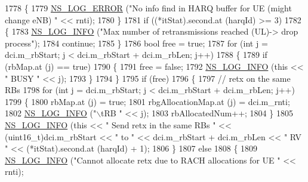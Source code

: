 \begin{DoxyCode}
1778                 \{
1779                   \hyperlink{group__logging_ga0261a8db1d4ac5f79417d117634fd455}{NS\_LOG\_ERROR} (\textcolor{stringliteral}{"No info find in HARQ buffer for UE (might change eNB) "} << 
      rnti);
1780                 \}
1781               \textcolor{keywordflow}{if} ((*itStat).second.at (harqId) >= 3)
1782                 \{
1783                   \hyperlink{group__logging_gafbd73ee2cf9f26b319f49086d8e860fb}{NS\_LOG\_INFO} (\textcolor{stringliteral}{"Max number of retransmissions reached (UL)-> drop process"});
1784                   \textcolor{keywordflow}{continue};
1785                 \}
1786               \textcolor{keywordtype}{bool} free = \textcolor{keyword}{true};
1787               \textcolor{keywordflow}{for} (\textcolor{keywordtype}{int} j = dci.m\_rbStart; j < dci.m\_rbStart + dci.m\_rbLen; j++)
1788                 \{
1789                   \textcolor{keywordflow}{if} (rbMap.at (j) == \textcolor{keyword}{true})
1790                     \{
1791                       free = \textcolor{keyword}{false};
1792                       \hyperlink{group__logging_gafbd73ee2cf9f26b319f49086d8e860fb}{NS\_LOG\_INFO} (\textcolor{keyword}{this} << \textcolor{stringliteral}{" BUSY "} << j);
1793                     \}
1794                 \}
1795               \textcolor{keywordflow}{if} (free)
1796                 \{
1797                   \textcolor{comment}{// retx on the same RBs}
1798                   \textcolor{keywordflow}{for} (\textcolor{keywordtype}{int} j = dci.m\_rbStart; j < dci.m\_rbStart + dci.m\_rbLen; j++)
1799                     \{
1800                       rbMap.at (j) = \textcolor{keyword}{true};
1801                       rbgAllocationMap.at (j) = dci.m\_rnti;
1802                       \hyperlink{group__logging_gafbd73ee2cf9f26b319f49086d8e860fb}{NS\_LOG\_INFO} (\textcolor{stringliteral}{"\(\backslash\)tRB "} << j);
1803                       rbAllocatedNum++;
1804                     \}
1805                   \hyperlink{group__logging_gafbd73ee2cf9f26b319f49086d8e860fb}{NS\_LOG\_INFO} (\textcolor{keyword}{this} << \textcolor{stringliteral}{" Send retx in the same RBs "} << (uint16\_t)dci.m\_rbStart 
      << \textcolor{stringliteral}{" to "} << dci.m\_rbStart + dci.m\_rbLen << \textcolor{stringliteral}{" RV "} << (*itStat).second.at (harqId) + 1);
1806                 \}
1807               \textcolor{keywordflow}{else}
1808                 \{
1809                   \hyperlink{group__logging_gafbd73ee2cf9f26b319f49086d8e860fb}{NS\_LOG\_INFO} (\textcolor{stringliteral}{"Cannot allocate retx due to RACH allocations for UE "} << rnti);

\end{DoxyCode}
